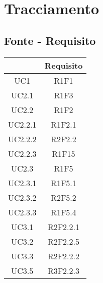 \section{Tracciamento} \label{section: tracciamento}

\subsection{Fonte - Requisito}\label{subsection: fonti}

\begin{table}[H]
	\centering
	\renewcommand{\arraystretch}{1.8}
	\begin{tabular}{c | c}
		\rowcolor[HTML]{125E28}
		\multicolumn{1}{c}{\color[HTML]{FFFFFF} \textbf{Fonte}} &
		\multicolumn{1}{c}{\color[HTML]{FFFFFF} \textbf{Requisito}}              \\
		\hline
		UC1                                                     & R1F1           \\ \hline
		UC2.1                                                   & R1F3           \\ \hline
		UC2.2                                                   & R1F2           \\ \hline
		UC2.2.1                                                 & R1F2.1         \\ \hline
		UC2.2.2                                                 & R2F2.2         \\ \hline
		UC2.2.3                                                 & R1F15          \\ \hline
		UC2.3                                                   & R1F5           \\ \hline
		UC2.3.1                                                 & R1F5.1         \\ \hline
		UC2.3.2                                                 & R2F5.2         \\ \hline
		UC2.3.3                                                 & R1F5.4         \\ \hline
		UC3.1                                                   & R2F2.2.1       \\ \hline
		UC3.2                                                   & R2F2.2.5       \\ \hline
		UC3.3                                                   & R2F2.2.2       \\ \hline
		UC3.5                                                   & R3F2.2.3       \\ \hline

\end{tabular}
\end{table}
